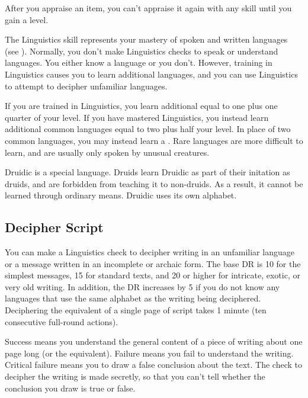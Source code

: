         After you appraise an item, you can't appraise it again with any skill until you gain a level.

\newpage
{}
        The Linguistics skill represents your mastery of spoken and written languages (see ).
        Normally, you don't make Linguistics checks to speak or understand languages.
        You either know a language or you don't.
        However, training in Linguistics causes you to learn additional languages, and you can use Linguistics to attempt to decipher unfamiliar languages.

        \label{Learning Languages}
        If you are trained in Linguistics, you learn additional  equal to one plus one quarter of your level.
        If you have mastered Linguistics, you instead learn additional common languages equal to two plus half your level.
        In place of two common languages, you may instead learn a .
        Rare languages are more difficult to learn, and are usually only spoken by unusual creatures.

        Druidic is a special language.
        Druids learn Druidic as part of their initation as druids, and are forbidden from teaching it to non-druids.
        As a result, it cannot be learned through ordinary means.
        Druidic uses its own alphabet.

    \subsection{Decipher Script}
        You can make a Linguistics check to decipher writing in an unfamiliar language or a message written in an incomplete or archaic form. The base DR is 10 for the simplest messages, 15 for standard texts, and 20 or higher for intricate, exotic, or very old writing. In addition, the DR increases by 5 if you do not know any languages that use the same alphabet as the writing being deciphered. Deciphering the equivalent of a single page of script takes 1 minute (ten consecutive full-round actions).

        Success means you understand the general content of a piece of writing about one page long (or the equivalent). Failure means you fail to understand the writing. Critical failure means you to draw a false conclusion about the text. The check to decipher the writing is made secretly, so that you can't tell whether the conclusion you draw is true or false.

